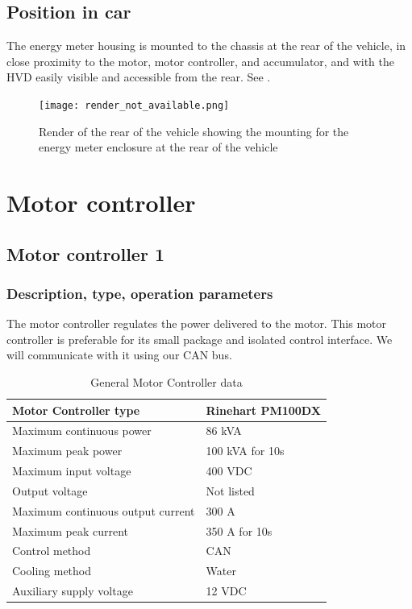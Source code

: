 \documentclass{article}
\begin{document}
\subsection{Position in car}
The energy meter housing is mounted to the chassis at the rear of the vehicle, in close proximity to the motor, motor controller, and accumulator, and with the HVD easily visible and accessible from the rear. See .

\begin{figure}
\centering
\texttt{[image: render\_not\_available.png]}
\caption{Render of the rear of the vehicle showing the mounting for the energy meter enclosure at the rear of the vehicle}
\label{fig:energy_meter_mounting_render}
\end{figure}


\section{Motor controller}\label{motor_controller}
\subsection{Motor controller 1}\label{motor_controller_1}
\subsubsection{Description, type, operation parameters}

The motor controller regulates the power delivered to the motor. This motor controller is preferable for its small package and isolated control interface. We will communicate with it using our CAN bus. 

\begin{table}[H]
	\centering
	\begin{tabular}{|l|l|}
	\hline
	Motor Controller type & Rinehart PM100DX \\ \hline
	Maximum continuous power & 86 kVA \\ \hline
	Maximum peak power & 100 kVA for 10s \\ \hline
	Maximum input voltage & 400 VDC \\ \hline
	Output voltage & Not listed \\ \hline
	Maximum continuous output current & 300 A \\ \hline
	Maximum peak current & 350 A for 10s \\ \hline
	Control method & CAN \\ \hline
	Cooling method & Water \\ \hline   
	Auxiliary supply voltage & 12 VDC \\ \hline
	\end{tabular}
	\caption{General Motor Controller data}
	\label{MC}
\end{table}
\end{document}
